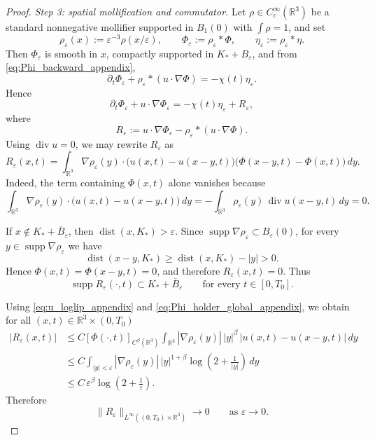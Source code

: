 \documentclass[reqno,11pt]{amsart}
\newcommand{\supp}{\operatorname{supp}}
\begin{document}
\begin{proof}
\smallskip
\noindent\emph{Step 3: spatial mollification and commutator.}
Let $\rho\in C_c^\infty(\mathbb R^3)$ be a standard nonnegative mollifier supported in
$B_1(0)$ with $\int\rho=1$, and set
\[
\rho_\varepsilon(x):=\varepsilon^{-3}\rho(x/\varepsilon),
\qquad
\Phi_\varepsilon:=\rho_\varepsilon * \Phi,
\qquad
\eta_\varepsilon:=\rho_\varepsilon * \eta.
\]
Then $\Phi_\varepsilon$ is smooth in $x$, compactly supported in $K_*+B_\varepsilon$, and
from \eqref{eq:Phi_backward_appendix},
\[
\partial_t\Phi_\varepsilon+\rho_\varepsilon*(u\cdot\nabla\Phi)
=
-\chi(t)\eta_\varepsilon .
\]
Hence
\begin{equation}
\label{eq:Phi_eps_eq_appendix}
\partial_t\Phi_\varepsilon+u\cdot\nabla\Phi_\varepsilon
=
-\chi(t)\eta_\varepsilon+R_\varepsilon,
\end{equation}
where
\[
R_\varepsilon
:=
u\cdot\nabla\Phi_\varepsilon-\rho_\varepsilon*(u\cdot\nabla\Phi).
\]
Using $\operatorname{div}u=0$, we may rewrite $R_\varepsilon$ as
\[
R_\varepsilon(x,t)
=
\int_{\mathbb R^3}
\nabla\rho_\varepsilon(y)\cdot\bigl(u(x,t)-u(x-y,t)\bigr)
\bigl(\Phi(x-y,t)-\Phi(x,t)\bigr)\,dy .
\]
Indeed, the term containing $\Phi(x,t)$ alone vanishes because
\[
\int_{\mathbb R^3}\nabla\rho_\varepsilon(y)\cdot\bigl(u(x,t)-u(x-y,t)\bigr)\,dy
=
-\int_{\mathbb R^3}\rho_\varepsilon(y)\,\operatorname{div}u(x-y,t)\,dy
=0.
\]



If $x\notin K_*+\overline B_\varepsilon$, then $\operatorname{dist}(x,K_*)>\varepsilon$. Since
$\supp \nabla\rho_\varepsilon\subset B_\varepsilon(0)$, for every
$y\in\supp \nabla\rho_\varepsilon$ we have
\[
\operatorname{dist}(x-y,K_*)\ge \operatorname{dist}(x,K_*)-|y|>0.
\]
Hence $\Phi(x,t)=\Phi(x-y,t)=0$, and therefore $R_\varepsilon(x,t)=0$. Thus
\begin{equation}
\label{eq:R_eps_support_appendix}
\supp R_\varepsilon(\cdot,t)\subset K_*+\overline B_\varepsilon
\qquad\text{for every }t\in[0,T_0].
\end{equation}

Using \eqref{eq:u_loglip_appendix} and \eqref{eq:Phi_holder_global_appendix}, we obtain
for all $(x,t)\in\mathbb R^3\times(0,T_0)$
\begin{align*}
|R_\varepsilon(x,t)|
&\le
C[\Phi(\cdot,t)]_{C^\beta(\mathbb R^3)}
\int_{\mathbb R^3}
|\nabla\rho_\varepsilon(y)|\,|y|^\beta\,|u(x,t)-u(x-y,t)|\,dy \\
&\le
C\int_{|y|<\varepsilon}
|\nabla\rho_\varepsilon(y)|\,|y|^{1+\beta}
\log\!\left(2+\frac1{|y|}\right)\,dy \\
&\le
C\,\varepsilon^\beta\log\!\left(2+\frac1\varepsilon\right).
\end{align*}
Therefore
\begin{equation}
\label{eq:R_eps_to_zero_appendix}
\|R_\varepsilon\|_{L^\infty((0,T_0)\times\mathbb R^3)}
\longrightarrow 0
\qquad\text{as }\varepsilon\to 0.
\end{equation}




\end{proof}
\end{document}
